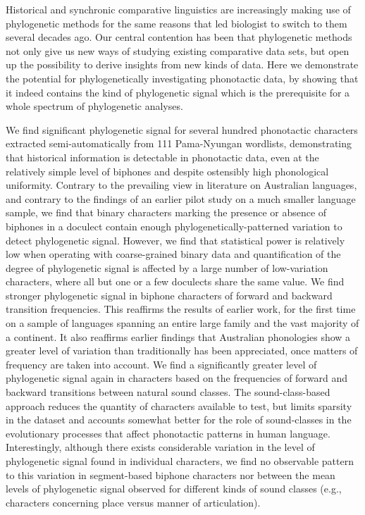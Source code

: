 Historical and synchronic comparative linguistics are increasingly making use of phylogenetic methods for the same reasons that led biologist to switch to them several decades ago. Our central contention has been that phylogenetic methods not only give us new ways of studying existing comparative data sets, but open up the possibility to derive insights from new kinds of data. Here we demonstrate the potential for phylogenetically investigating phonotactic data, by showing that it indeed contains the kind of phylogenetic signal which is the prerequisite for a whole spectrum of phylogenetic analyses.

We find significant phylogenetic signal for several hundred phonotactic characters extracted semi-automatically from 111 Pama-Nyungan wordlists, demonstrating that historical information is detectable in phonotactic data, even at the relatively simple level of biphones and despite ostensibly high phonological uniformity. Contrary to the prevailing view in literature on Australian languages, and contrary to the findings of an earlier pilot study on a much smaller language sample, we find that binary characters marking the presence or absence of biphones in a doculect contain enough phylogenetically-patterned variation to detect phylogenetic signal. However, we find that statistical power is relatively low when operating with coarse-grained binary data and quantification of the degree of phylogenetic signal is affected by a large number of low-variation characters, where all but one or a few doculects share the same value. We find stronger phylogenetic signal in biphone characters of forward and backward transition frequencies. This reaffirms the results of earlier work, for the first time on a sample of languages spanning an entire large family and the vast majority of a continent. It also reaffirms earlier findings that Australian phonologies show a greater level of variation than traditionally has been appreciated, once matters of frequency are taken into account. We find a significantly greater level of phylogenetic signal again in characters based on the frequencies of forward and backward transitions between natural sound classes. The sound-class-based approach reduces the quantity of characters available to test, but limits sparsity in the dataset and accounts somewhat better for the role of sound-classes in the evolutionary processes that affect phonotactic patterns in human language. Interestingly, although there exists considerable variation in the level of phylogenetic signal found in individual characters, we find no observable pattern to this variation in segment-based biphone characters nor between the mean levels of phylogenetic signal observed for different kinds of sound classes (e.g., characters concerning place versus manner of articulation).

